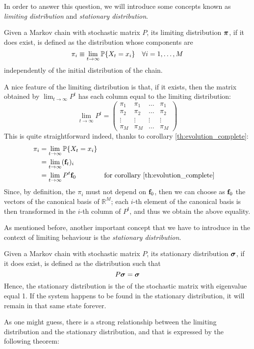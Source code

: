 \smallskip
In order to answer this question, we will introduce some concepts known as \emph{limiting distribution} and \emph{stationary distribution}.

\begin{ndef}
Given a Markov chain with stochastic matrix $P$, its limiting distribution $\boldsymbol{\pi}$, if it does exist, is defined as the distribution whose components are
\begin{equation}
    \pi_i \equiv \lim_{t \rightarrow \infty} \mathbb{P}\{X_t = x_i\} \quad \forall i=1,\dots,M
\end{equation}
independently of the initial distribution of the chain.
\end{ndef}

A nice feature of the limiting distribution is that, if it exists, then the matrix obtained by $\lim_{t \rightarrow \infty} P^t$ has each column equal to the limiting distribution:
\begin{equation}
    \lim_{t \rightarrow \infty} P^t = 
    \begin{pmatrix}
        \pi_1 & \pi_1 & \dots & \pi_1 \\
        \pi_2 & \pi_2 & \dots & \pi_2 \\
        \vdots & \vdots & \vdots & \vdots \\
        \pi_M & \pi_M & \dots & \pi_M
    \end{pmatrix}
\end{equation}
This is quite straightforward indeed, thanks to corollary \ref{th:evolution_complete}:
\begin{align}
    \pi_i
        & = \lim_{t \rightarrow \infty} \mathbb{P}\{X_t = x_i\} \\
        & = \lim_{t \rightarrow \infty} (\mathbf{f}_t)_i \\
        & = \lim_{t \rightarrow \infty} P^t \mathbf{f}_0 && \text{for corollary \ref{th:evolution_complete}}
\end{align}
Since, by definition, the $\pi_i$ must not depend on $\mathbf{f}_0$, then we can choose as $\mathbf{f}_0$ the vectors of the canonical basis of $\mathbb{R}^M$; each $i$-th element of the canonical basis is then transformed in the $i$-th column of $P^t$, and thus we obtain the above equality. 

\medskip
As mentioned before, another important concept that we have to introduce in the context of limiting behaviour is the \emph{stationary distribution}.

\begin{ndef} 
    Given a Markov chain with stochastic matrix $P$, its stationary distribution $\boldsymbol{\sigma}$, if it does exist, is defined as the distribution such that 
    \begin{equation}
        P \boldsymbol{\sigma} = \boldsymbol{\sigma}
    \end{equation}
    Hence, the stationary distribution is the  of the stochastic matrix with eigenvalue equal 1. If the system happens to be found in the stationary distribution, it will remain in that same state forever.
\end{ndef}
As one might guess, there is a strong relationship between the limiting distribution and the stationary distribution, and that is expressed by the following theorem:

